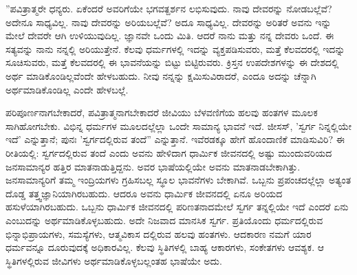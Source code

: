 ''ಪವಿತ್ರಾತ್ಮರೇ ಧನ್ಯರು. ಏಕೆಂದರೆ ಅವರಿಗೆಯೇ ಭಗವತ್ದರ್ಶನ ಲಭಿಸುವುದು. ನಾವು ದೇವರನ್ನು ನೋಡಬಲ್ಲೆವೆ? ಅದೇನೂ ಸಾಧ್ಯವಿಲ್ಲ. ನಾವು ದೇವರನ್ನು ಅರಿಯಬಲ್ಲೆವೆ? ಅದೂ ಸಾಧ್ಯವಿಲ್ಲ. ದೇವರನ್ನು ಅರಿತರೆ ಅವನು ಇನ್ನು ಮೇಲೆ ದೇವರೇ ಆಗಿ ಉಳಿಯುವುದಿಲ್ಲ. ಜ್ಞಾನವೇ ಒಂದು ಮಿತಿ. ಆದರೆ ನಾನು ಮತ್ತು ನನ್ನ ದೇವರು ಒಂದೆ. ಈ ಸತ್ಯವನ್ನು ನಾನು ನನ್ನಲ್ಲಿ ಅರಿಯುತ್ತೇನೆ. ಕೆಲವು ಧರ್ಮಗಳಲ್ಲಿ ಇದನ್ನು ವ್ಯಕ್ತಪಡಿಸುವರು, ಮತ್ತೆ ಕೆಲವದರಲ್ಲಿ ಇದನ್ನು ಸೂಚಿಸುವರು, ಮತ್ತೆ ಕೆಲವದರಲ್ಲಿ ಈ ಭಾವನೆಯನ್ನು ಬಿಟ್ಟು ಬಿಟ್ಟಿರುವರು. ಕ್ರಿಸ್ತನ ಉಪದೇಶಗಳನ್ನು ಈ ದೇಶದಲ್ಲಿ ಅರ್ಥ ಮಾಡಿಕೊಂಡಿಲ್ಲವೆಂದೇ ಹೇಳಬಹುದು. ನೀವು ನನ್ನನ್ನು ಕ್ಷಮಿಸುವಿರಾದರೆ, ಎಂದೂ ಅದನ್ನು ಚೆನ್ನಾಗಿ ಅರ್ಥಮಾಡಿಕೊಂಡಿಲ್ಲ ಎಂದೇ ಹೇಳಬಲ್ಲೆ.

ಪರಿಪೂರ್ಣನಾಗಬೇಕಾದರೆ, ಪವಿತ್ರಾತ್ಮನಾಗಬೇಕಾದರೆ ಜೀವಿಯು ಬೆಳವಣಿಗೆಯ ಹಲವು ಹಂತಗಳ ಮೂಲಕ ಸಾಗಿಹೋಗಬೇಕು. ವಿಭಿನ್ನ ಧರ್ಮಗಳ ಮೂಲದಲ್ಲೆಲ್ಲಾ ಒಂದೇ ಸಾಮಾನ್ಯ ಭಾವನೆ ಇದೆ. ಜೀಸಸ್, 'ಸ್ವರ್ಗ ನಿನ್ನಲ್ಲಿಯೇ ಇದೆ' ಎನ್ನುತ್ತಾನೆ; ಪುನಃ 'ಸ್ವರ್ಗದಲ್ಲಿರುವ ತಂದೆ'' ಎನ್ನುತ್ತಾನೆ. ಇವೆರಡಕ್ಕೂ ಹೇಗೆ ಹೊಂದಾಣಿಕೆ ಮಾಡಿಸುವಿರಿ? ಈ ರೀತಿಯಲ್ಲಿ: ಸ್ವರ್ಗದಲ್ಲಿರುವ ತಂದೆ ಎಂದು ಅವನು ಹೇಳಿದಾಗ ಧಾರ್ಮಿಕ ಜೀವನದಲ್ಲಿ ಅಷ್ಟು ಮುಂದುವರಿಯದ ಜನಸಾಮಾನ್ಯರ ಹತ್ತಿರ ಮಾತನಾಡುತ್ತಿದ್ದನು. ಅವರ ಭಾಷೆಯಲ್ಲಿಯೇ ಅವನು ಮಾತನಾಡಬೇಕಾಗಿತ್ತು. ಜನಸಾಮಾನ್ಯರಿಗೆ ತಮ್ಮ ಇಂದ್ರಿಯಗಳು ಗ್ರಹಿಸಬಲ್ಲ ಸ್ಥೂಲ ಭಾವನೆಗಳು ಬೇಕಾಗಿವೆ. ಒಬ್ಬನು ಪ್ರಪಂಚದಲ್ಲೆಲ್ಲಾ ಅತ್ಯಂತ ದೊಡ್ಡ ತತ್ತ್ವಜ್ಞಾನಿಯಾಗಿರಬಹುದು. ಆದರೂ ಅವನು ಧಾರ್ಮಿಕ ಜೀವನದಲ್ಲಿ ಏನೂ ಅರಿಯದ ಹಸುಳೆಯಾಗಿರಬಹುದು. ಒಬ್ಬನು ಧಾರ್ಮಿಕ ಜೀವನದಲ್ಲಿ ಪರಿಣತನಾದಮೇಲೆ ಸ್ವರ್ಗ ತನ್ನಲ್ಲಿಯೇ ಇದೆ ಎಂದರೆ ಏನು ಎಂಬುದನ್ನು ಅರ್ಥಮಾಡಿಕೊಳ್ಳಬಹುದು. ಅದೇ ನಿಜವಾದ ಮಾನಸಿಕ ಸ್ವರ್ಗ. ಪ್ರತಿಯೊಂದು ಧರ್ಮದಲ್ಲಿರುವ ಭಿನ್ನಾಭಿಪ್ರಾಯಗಳು, ಸಮಸ್ಯೆಗಳು, ಆತ್ಮವಿಕಾಸ ದಲ್ಲಿರುವ ಹಲವು ಹಂತಗಳು. ಆದಕಾರಣ ನಮಗೆ ಯಾರ ಧರ್ಮವನ್ನೂ ದೂರುವುದಕ್ಕೆ ಅಧಿಕಾರವಿಲ್ಲ. ಕೆಲವು ಸ್ಥಿತಿಗಳಲ್ಲಿ ಬಾಹ್ಯ ಆಕಾರಗಳು, ಸಂಕೇತಗಳು ಆವಶ್ಯಕ. ಆ ಸ್ಥಿತಿಗಳಲ್ಲಿರುವ ಜೀವಿಗಳು ಅರ್ಥಮಾಡಿಕೊಳ್ಳಬಲ್ಲಂತಹ ಭಾಷೆಯೇ ಅದು.

